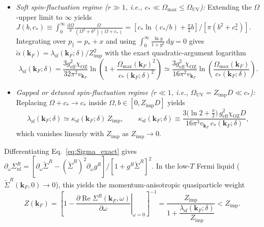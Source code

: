 \documentclass[11pt,a4paper]{article}
\numberwithin{equation}{section}
\theoremstyle{plain}
\theoremstyle{definition}
\providecommand{\vk}{\mathbf{k}}
\providecommand{\re}{\operatorname{Re}}
\providecommand{\dd}{\mathrm{d}}
\begin{document}
\begin{itemize}
    \item \emph{Soft spin-fluctuation regime ($r \gg 1$, i.e., $c_* \ll \Omega_{\max} \le \Omega_{\mathrm{UV}}$):}
    Extending the $\Omega$-upper limit to $\infty$ yields
    $J(b,c_*) \equiv \int_0^\infty \frac{\dd\Omega}{\pi}\frac{\Omega}{(\Omega^2+b^2)(\Omega+c_*)}
    = [c_*\ln(c_*/b) + \frac{\pi}{2}b]/[\pi(b^2+c_*^2)]$. Integrating over
    $p_\parallel = p_* + x$ and using $\int_0^\infty \frac{\ln y}{1+y^2}\,\dd y = 0$
    gives $\tilde{\alpha}(\vk_F) = \lambda_{\mathrm{sf}}(\vk_F;\delta)/Z_{\mathrm{imp}}^2$
    with the exact quadratic-argument logarithm
    \begin{equation}
        \lambda_{\mathrm{sf}}(\vk_F;\delta)
        = \frac{3 g_{\mathrm{eff}}^2 \chi_{\mathrm{OZ}}}{32\pi^2 v_{\vk_F}}
          \ln\!\left(1 + \frac{\Omega_{\max}(\vk_F)^2}{c_*(\vk_F;\delta)^2}\right)
        \simeq \frac{3 g_{\mathrm{eff}}^2 \chi_{\mathrm{OZ}}}{16\pi^2 v_{\vk_F}}
          \ln\!\left(\frac{\Omega_{\max}(\vk_F)}{c_*(\vk_F;\delta)}\right).
        \label{eq:lambda_sf_soft}
    \end{equation}

    \item \emph{Gapped or detuned spin-fluctuation regime ($r \ll 1$, i.e., $\Omega_{\mathrm{UV}} = Z_{\mathrm{imp}}D \ll c_*$):}
    Replacing $\Omega + c_* \to c_*$ inside $\Omega, b \in [0, Z_{\mathrm{imp}}D]$ yields
    \begin{equation}
        \lambda_{\mathrm{sf}}(\vk_F;\delta) \simeq \kappa_{\mathrm{sf}}(\vk_F;\delta)\, Z_{\mathrm{imp}},
        \qquad
        \kappa_{\mathrm{sf}}(\vk_F;\delta)
        \equiv \frac{3\bigl(\ln 2 + \frac{\pi}{2}\bigr)\, g_{\mathrm{eff}}^2 \chi_{\mathrm{OZ}} D}
                    {16\pi^3 v_{\vk_F}\, c_*(\vk_F;\delta)},
        \label{eq:lambda_sf_gapped}
    \end{equation}
    which vanishes linearly with $Z_{\mathrm{imp}}$ as $Z_{\mathrm{imp}} \to 0$.
\end{itemize}

Differentiating Eq.~\eqref{eq:Sigma_exact} gives
$\partial_\omega\Sigma_{\mathrm{nl}}^R = [\partial_\omega\tilde{\Sigma}^R - (\tilde{\Sigma}^R)^2\partial_\omega g^R]/[1 + g^R\tilde{\Sigma}^R]^2$.
In the low-$T$ Fermi liquid ($\tilde{\Sigma}^R(\vk_F,0) \to 0$), this yields the
momentum-anisotropic quasiparticle weight
\begin{equation}
    Z(\vk_F)
    = \left[1 - \left.\frac{\partial\re\Sigma^R(\vk_F,\omega)}{\partial\omega}\right|_{\omega=0}\right]^{-1}
    = \frac{Z_{\mathrm{imp}}}{1 + \dfrac{\lambda_{\mathrm{sf}}(\vk_F;\delta)}{Z_{\mathrm{imp}}}}
    < Z_{\mathrm{imp}}.
    \label{eq:Z_k}
\end{equation}
\end{document}
